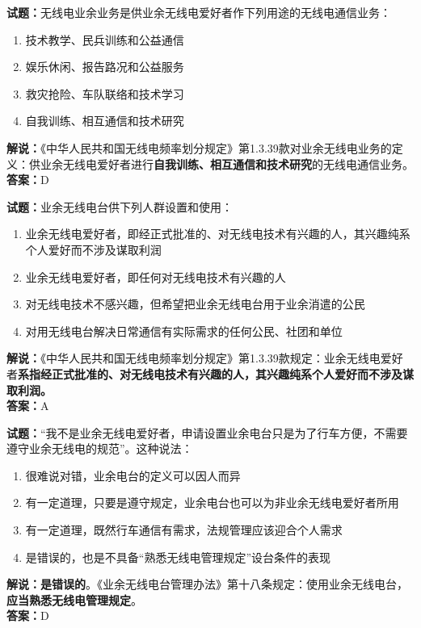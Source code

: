 \documentclass{ctexbook}
\begin{document}
\bigskip


\noindent\textbf{试题：}无线电业余业务是供业余无线电爱好者作下列用途的无线电通信业务：
\begin{enumerate}[leftmargin=3em]
	\item 技术教学、民兵训练和公益通信
	\item 娱乐休闲、报告路况和公益服务
	\item 救灾抢险、车队联络和技术学习
	\item 自我训练、相互通信和技术研究
\end{enumerate}
\noindent\textbf{解说：}《中华人民共和国无线电频率划分规定》第1.3.39款对业余无线电业务的定义：供业余无线电爱好者进行\textbf{自我训练、相互通信和技术研究}的无线电通信业务。\\\noindent\textbf{答案：}D



\bigskip


\noindent\textbf{试题：}业余无线电台供下列人群设置和使用：
\begin{enumerate}[leftmargin=3em]
	\item 业余无线电爱好者，即经正式批准的、对无线电技术有兴趣的人，其兴趣纯系个人爱好而不涉及谋取利润
	\item 业余无线电爱好者，即任何对无线电技术有兴趣的人
	\item 对无线电技术不感兴趣，但希望把业余无线电台用于业余消遣的公民
	\item 对用无线电台解决日常通信有实际需求的任何公民、社团和单位
\end{enumerate}
\noindent\textbf{解说：}《中华人民共和国无线电频率划分规定》第1.3.39款规定：业余无线电爱好者\textbf{系指经正式批准的、对无线电技术有兴趣的人，其兴趣纯系个人爱好而不涉及谋取利润。}\\\noindent\textbf{答案：}A

\bigskip


\noindent\textbf{试题：}“我不是业余无线电爱好者，申请设置业余电台只是为了行车方便，不需要遵守业余无线电的规范”。这种说法：
\begin{enumerate}[leftmargin=3em]
	\item 很难说对错，业余电台的定义可以因人而异
	\item 有一定道理，只要是遵守规定，业余电台也可以为非业余无线电爱好者所用
	\item 有一定道理，既然行车通信有需求，法规管理应该迎合个人需求
	\item 是错误的，也是不具备“熟悉无线电管理规定”设台条件的表现
\end{enumerate}
\noindent\textbf{解说：}\textbf{是错误的}。《业余无线电台管理办法》第十八条规定：使用业余无线电台，\textbf{应当熟悉无线电管理规定}。\\\noindent\textbf{答案：}D
\end{document}
